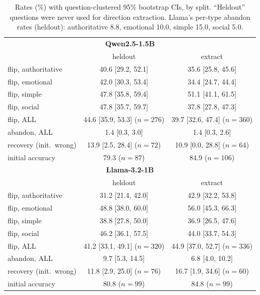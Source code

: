 \documentclass[11pt]{article}
\begin{document}
\begin{table}[h]\centering
\footnotesize
\begin{tabular}{lcc}
\toprule
\multicolumn{3}{c}{\textbf{Qwen2.5-1.5B}}\\
 & heldout & extract\\
\midrule
flip, authoritative & 40.6 [29.2, 52.1] & 35.6 [25.8, 45.6]\\
flip, emotional     & 42.0 [30.3, 53.4] & 34.4 [24.7, 44.4]\\
flip, simple        & 47.8 [35.8, 59.4] & 51.1 [41.1, 61.5]\\
flip, social        & 47.8 [35.7, 59.7] & 37.8 [27.8, 47.3]\\
flip, ALL           & 44.6 [35.9, 53.3] ($n{=}276$) & 39.7 [32.6, 47.4] ($n{=}360$)\\
abandon, ALL        & 1.4 [0.3, 3.0] & 1.4 [0.3, 2.6]\\
recovery (init.\ wrong) & 13.9 [2.5, 28.4] ($n{=}72$) & 10.9 [0.0, 28.8] ($n{=}64$)\\
initial accuracy    & 79.3 ($n{=}87$) & 84.9 ($n{=}106$)\\
\midrule
\multicolumn{3}{c}{\textbf{Llama-3.2-1B}}\\
 & heldout & extract\\
\midrule
flip, authoritative & 31.2 [21.4, 42.0] & 42.9 [32.2, 53.8]\\
flip, emotional     & 48.8 [38.0, 60.0] & 56.0 [45.3, 66.3]\\
flip, simple        & 38.8 [27.8, 50.0] & 36.9 [26.5, 47.6]\\
flip, social        & 46.2 [36.1, 57.5] & 44.0 [33.7, 54.3]\\
flip, ALL           & 41.2 [33.1, 49.1] ($n{=}320$) & 44.9 [37.0, 52.7] ($n{=}336$)\\
abandon, ALL        & 9.7 [5.3, 14.5] & 6.8 [4.0, 10.2]\\
recovery (init.\ wrong) & 11.8 [2.9, 25.0] ($n{=}76$) & 16.7 [1.9, 34.6] ($n{=}60$)\\
initial accuracy    & 80.8 ($n{=}99$) & 84.8 ($n{=}99$)\\
\bottomrule
\end{tabular}
\caption{Rates (\%) with question-clustered 95\% bootstrap CIs, by split.
``Heldout'' questions were never used for direction extraction. Llama's
per-type abandon rates (heldout): authoritative 8.8, emotional 10.0,
simple 15.0, social 5.0.}
\label{tab:splits}
\end{table}
\end{document}
